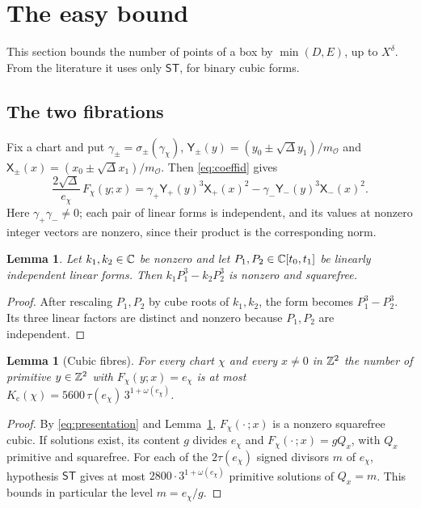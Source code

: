 \documentclass[11pt,reqno]{amsart}
\newtheorem{lemma}[theorem]{Lemma}
\theoremstyle{definition}
\theoremstyle{remark}
\numberwithin{equation}{section}
\newcommand{\ST}{\mathsf{ST}}\newcommand{\CC}{\mathsf{CC}}\newcommand{\GE}{\mathsf{GE}}
\newcommand{\OO}{\mathcal O}
\begin{document}
\section{The easy bound}\label{sec:easy}
This section bounds the number of points of a box by $\min(D,E)$, up to
$X^\delta$. From the literature it uses only $\ST$, for binary cubic forms.

\subsection{The two fibrations}
Fix a chart and put $\gamma_\pm=\sigma_\pm(\gamma_\chi)$,
$\mathsf Y_\pm(y)=(y_0\pm\sqrt\Delta y_1)/m_{\OO}$ and
$\mathsf X_\pm(x)=(x_0\pm\sqrt\Delta x_1)/m_{\OO}$.
Then \eqref{eq:coeffid} gives
\begin{equation}\label{eq:presentation}
 \frac{2\sqrt\Delta}{e_\chi}\,F_\chi(y;x)
 =\gamma_+\mathsf Y_+(y)^3\mathsf X_+(x)^2-\gamma_-\mathsf Y_-(y)^3\mathsf X_-(x)^2 .
\end{equation}
Here $\gamma_+\gamma_-\ne0$; each pair of linear forms is independent,
and its values at nonzero integer vectors are nonzero, since their
product is the corresponding norm.

\begin{lemma}\label{lem:cubes}
Let $k_1,k_2\in\mathbb C$ be nonzero and let $P_1,P_2\in\mathbb C[t_0,t_1]$ be linearly
independent linear forms. Then $k_1P_1^3-k_2P_2^3$ is nonzero and squarefree.
\end{lemma}
\begin{proof}
After rescaling $P_1,P_2$ by cube roots of $k_1,k_2$, the form becomes
$P_1^3-P_2^3$. Its three linear factors are distinct and nonzero because
$P_1,P_2$ are independent.
\end{proof}

\begin{lemma}[Cubic fibres]\label{lem:cubicfibre}
For every chart $\chi$ and every $x\ne0$ in $\mathbb Z^2$ the number
of primitive $y\in\mathbb Z^2$ with $F_\chi(y;x)=e_\chi$ is at most
$K_{\mathrm c}(\chi)=5600\,\tau(e_\chi)\,3^{1+\omega(e_\chi)}$.
\end{lemma}
\begin{proof}
By \eqref{eq:presentation} and Lemma~\ref{lem:cubes},
$F_\chi(\cdot\,;x)$ is a nonzero squarefree cubic. If solutions exist,
its content $g$ divides $e_\chi$ and $F_\chi(\cdot\,;x)=gQ_x$, with
$Q_x$ primitive and squarefree. For each of the $2\tau(e_\chi)$ signed
divisors $m$ of $e_\chi$, hypothesis $\ST$ gives at most
$2800\cdot3^{1+\omega(e_\chi)}$ primitive solutions of $Q_x=m$.
This bounds in particular the level $m=e_\chi/g$.
\end{proof}
\end{document}
